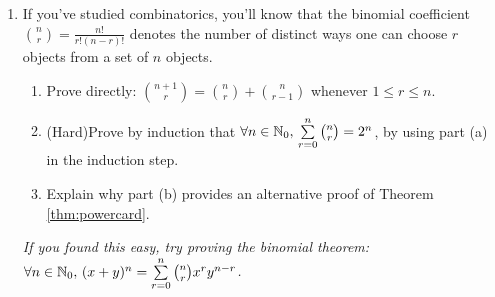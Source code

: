 \begin{exercises}{}{}
\begin{enumerate}
	
		\item\label{ex:binom} If you've studied combinatorics, you'll know that the binomial coefficient $\binom nr=\frac{n!}{r!(n-r)!}$ denotes the number of distinct ways one can choose $r$ objects from a set of $n$ objects.
		\begin{enumerate}
		  \item Prove directly: $\binom{n+1}r=\binom nr+\binom n{r-1}$ whenever $1\le r\le n$.
			\item (Hard)\lstsp Prove by induction that $\forall n\in\mathbb{N}_0,\,\sum\limits_{r=0}^n\binom nr=2^n$, by using part (a) in the induction step.
			\item Explain why part (b) provides an alternative proof of Theorem \ref{thm:powercard}.
		\end{enumerate}
		\emph{If you found this easy, try proving the binomial theorem: $\forall n\in\mathbb{N}_0,\,(x+y)^n=\sum\limits_{r=0}^n\binom nrx^ry^{n-r}$.}



	\end{enumerate}

\end{exercises}


